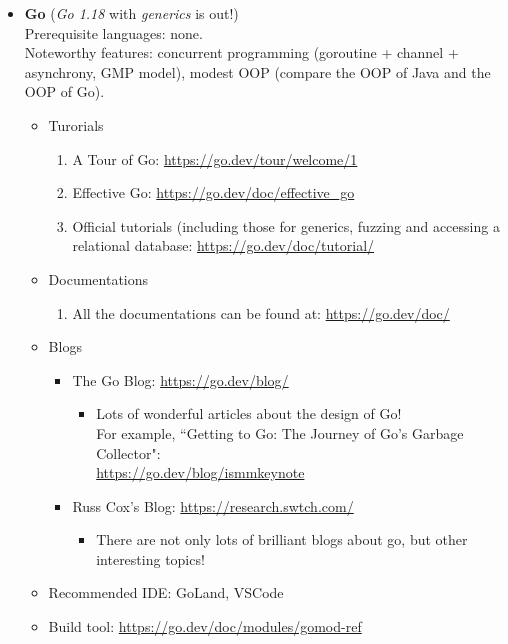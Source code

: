 \documentclass{article}
\begin{document}
\begin{itemize}
    \item \textbf{Go} (\emph{Go 1.18} with \emph{generics} is out!)\\
    Prerequisite languages: none.\\
    Noteworthy features: concurrent programming (goroutine + channel + asynchrony, GMP model), modest OOP (compare the OOP of Java and the OOP of Go).
    \begin{itemize}
        \item Turorials
        \begin{enumerate}
            \item A Tour of Go:
            \href{https://go.dev/tour/welcome/1}{https://go.dev/tour/welcome/1}
            \item Effective Go:
            \href{https://go.dev/doc/effective\_go}{https://go.dev/doc/effective\_go}
            \item Official tutorials (including those for generics, fuzzing and accessing a relational database:
            \href{https://go.dev/doc/tutorial/}{https://go.dev/doc/tutorial/}
        \end{enumerate}
        \item Documentations
        \begin{enumerate}
            \item All the documentations can be found at:
            \href{https://go.dev/doc/}{https://go.dev/doc/}
        \end{enumerate}
        \item Blogs
        \begin{itemize}
            \item The Go Blog:
            \href{https://go.dev/blog/}{https://go.dev/blog/}
            \begin{itemize}
                \item Lots of wonderful articles about the design of Go!\\
                For example, ``Getting to Go: The Journey of Go's Garbage Collector":\\
                \href{https://go.dev/blog/ismmkeynote}{https://go.dev/blog/ismmkeynote}
            \end{itemize}    
            \item Russ Cox's Blog:
            \href{https://research.swtch.com/}{https://research.swtch.com/}
            \begin{itemize}
                \item There are not only lots of brilliant blogs about go, but other interesting topics!
            \end{itemize}
        \end{itemize}
        \item Recommended IDE: GoLand, VSCode
        \item Build tool:
        \href{https://go.dev/doc/modules/gomod-ref}{https://go.dev/doc/modules/gomod-ref}
    \end{itemize}
    

\end{itemize}
\end{document}
